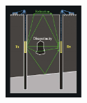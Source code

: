 \documentclass{beamer}
\begin{document}
\begin{frame}
\begin{columns}
\begin{column}{0.5\textwidth}
      \begin{figure}
        \centering
        \includegraphics[width=\linewidth, height=3.5cm]{figs/borehole.png}
      \end{figure}
      
    \end{column}
  \end{columns}
\end{frame}


\begin{frame}
\end{frame}
\end{document}
